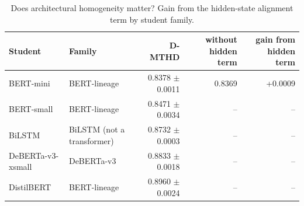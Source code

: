 \begin{table}[t]
\centering
\caption{Does architectural homogeneity matter? Gain from the hidden-state alignment term by student family.}
\label{tab:homogeneity}
\begin{tabular}{llrrr}
\toprule
Student & Family & D-MTHD & without hidden term & gain from hidden term \\
\midrule
BERT-mini & BERT-lineage & 0.8378 $\pm$ 0.0011 & 0.8369 & +0.0009 \\
BERT-small & BERT-lineage & 0.8471 $\pm$ 0.0034 & -- & -- \\
BiLSTM & BiLSTM (not a transformer) & 0.8732 $\pm$ 0.0003 & -- & -- \\
DeBERTa-v3-xsmall & DeBERTa-v3 & 0.8833 $\pm$ 0.0018 & -- & -- \\
DistilBERT & BERT-lineage & 0.8960 $\pm$ 0.0024 & -- & -- \\
\bottomrule
\end{tabular}
\end{table}